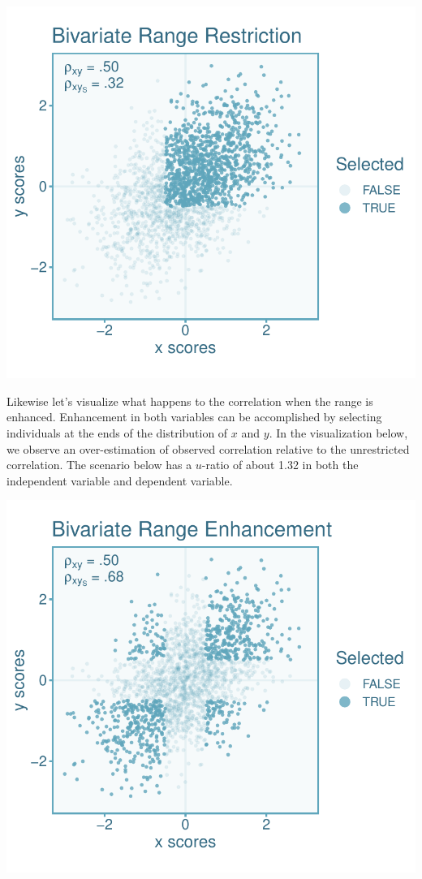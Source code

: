 \documentclass[
  letterpaper,
  DIV=11,
  numbers=noendperiod]{scrreprt}
\begin{document}
\includegraphics{indirect_range_restriction_files/figure-pdf/unnamed-chunk-4-1.pdf}

Likewise let's visualize what happens to the correlation when the range
is enhanced. Enhancement in both variables can be accomplished by
selecting individuals at the ends of the distribution of \(x\) and
\(y\). In the visualization below, we observe an over-estimation of
observed correlation relative to the unrestricted correlation. The
scenario below has a \(u\)-ratio of about 1.32 in both the independent
variable and dependent variable.

\includegraphics{indirect_range_restriction_files/figure-pdf/unnamed-chunk-5-1.pdf}
\end{document}
